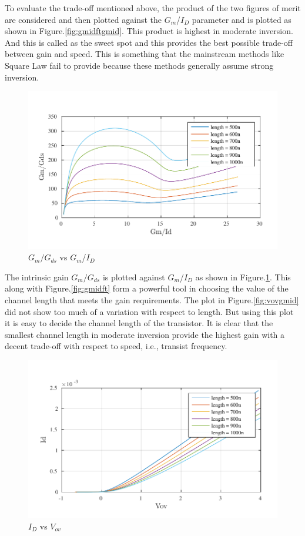 To evaluate the trade-off mentioned above, the product of the two figures of merit are considered and then plotted against the $G_m$/$I_D$ parameter and is plotted as shown in Figure.\ref{fig:gmidftgmid}. This product is highest in moderate inversion. And this is called as the sweet spot and this provides the best possible trade-off between gain and speed. This is something that the mainstream methods like Square Law fail to provide because these methods generally assume strong inversion.

\begin{figure} [H]
\centering
\includegraphics[scale=1]{Figures/Misc/PDFs/nmos_len_gmidgmgds.pdf}
\caption{$G_m/G_{ds}$ vs $G_m$/$I_D$}
\label{fig:gmidgmgds}
\end{figure}

The intrinsic gain $G_m/G_{ds}$ is plotted against $G_m$/$I_D$ as shown in Figure.\ref{fig:gmidgmgds}. This along with Figure.\ref{fig:gmidft} form a powerful tool in choosing the value of the channel length that meets the gain requirements. The plot in Figure.\ref{fig:vovgmid} did not show too much of a variation with respect to length. But using this plot it is easy to decide the channel length of the transistor. It is clear that the smallest channel length in moderate inversion provide the highest gain with a decent trade-off with respect to speed, i.e., transist frequency.

\begin{figure} [H]
\centering
\includegraphics[scale=1]{Figures/Misc/PDFs/nmos_len_vovid.pdf}
\caption{$I_D$ vs $V_{ov}$}
\label{fig:vovid}
\end{figure}

